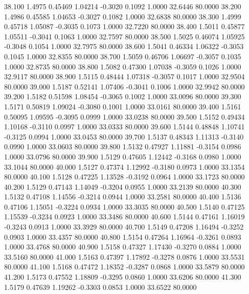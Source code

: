   38.100   1.4975   0.45469   1.04214  -0.3020   0.1092   1.0000  32.6446  80.0000
  38.200   1.4986   0.45585   1.04653  -0.3027   0.1082   1.0000  32.6838  80.0000
  38.300   1.4999   0.45718   1.05087  -0.3035   0.1073   1.0000  32.7220  80.0000
  38.400   1.5011   0.45877   1.05511  -0.3041   0.1063   1.0000  32.7597  80.0000
  38.500   1.5025   0.46074   1.05925  -0.3048   0.1054   1.0000  32.7975  80.0000
  38.600   1.5041   0.46334   1.06322  -0.3053   0.1045   1.0000  32.8355  80.0000
  38.700   1.5059   0.46706   1.06697  -0.3057   0.1035   1.0000  32.8735  80.0000
  38.800   1.5082   0.47300   1.07038  -0.3059   0.1026   1.0000  32.9117  80.0000
  38.900   1.5115   0.48444   1.07318  -0.3057   0.1017   1.0000  32.9504  80.0000
  39.000   1.5187   0.52141   1.07406  -0.3041   0.1006   1.0000  32.9942  80.0000
  39.200   1.5182   0.51598   1.08454  -0.3065   0.1002   1.0000  33.0096  80.0000
  39.300   1.5171   0.50819   1.09024  -0.3080   0.1001   1.0000  33.0161  80.0000
  39.400   1.5161   0.50095   1.09595  -0.3095   0.0999   1.0000  33.0238  80.0000
  39.500   1.5152   0.49434   1.10168  -0.3110   0.0997   1.0000  33.0333  80.0000
  39.600   1.5144   0.48848   1.10741  -0.3125   0.0994   1.0000  33.0453  80.0000
  39.700   1.5137   0.48343   1.11313  -0.3140   0.0990   1.0000  33.0603  80.0000
  39.800   1.5132   0.47927   1.11881  -0.3154   0.0986   1.0000  33.0796  80.0000
  39.900   1.5129   0.47605   1.12442  -0.3168   0.0980   1.0000  33.1044  80.0000
  40.000   1.5127   0.47374   1.12992  -0.3180   0.0973   1.0000  33.1354  80.0000
  40.100   1.5128   0.47225   1.13528  -0.3192   0.0964   1.0000  33.1723  80.0000
  40.200   1.5129   0.47143   1.14049  -0.3204   0.0955   1.0000  33.2139  80.0000
  40.300   1.5132   0.47108   1.14556  -0.3214   0.0944   1.0000  33.2581  80.0000
  40.400   1.5136   0.47106   1.15051  -0.3224   0.0934   1.0000  33.3035  80.0000
  40.500   1.5140   0.47125   1.15539  -0.3234   0.0923   1.0000  33.3486  80.0000
  40.600   1.5144   0.47161   1.16019  -0.3243   0.0913   1.0000  33.3929  80.0000
  40.700   1.5149   0.47208   1.16494  -0.3252   0.0903   1.0000  33.4357  80.0000
  40.800   1.5154   0.47264   1.16964  -0.3261   0.0893   1.0000  33.4768  80.0000
  40.900   1.5158   0.47327   1.17430  -0.3270   0.0884   1.0000  33.5160  80.0000
  41.000   1.5163   0.47397   1.17892  -0.3278   0.0876   1.0000  33.5531  80.0000
  41.100   1.5168   0.47472   1.18352  -0.3287   0.0868   1.0000  33.5879  80.0000
  41.200   1.5173   0.47552   1.18809  -0.3295   0.0860   1.0000  33.6206  80.0000
  41.300   1.5179   0.47639   1.19262  -0.3303   0.0853   1.0000  33.6522  80.0000
